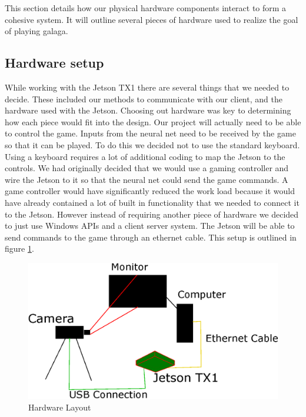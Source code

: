 \documentclass[onecolumn, draftclsnofoot,10pt, compsoc]{IEEEtran}
\begin{document}
This section details how our physical hardware components interact to form a cohesive system.
It will outline several pieces of hardware used to realize the goal of playing galaga.

\subsection{Hardware setup}%

While working with the Jetson TX1 there are several things that we needed to decide.
These included our methods to communicate with our client, and the hardware used with the Jetson.
Choosing out hardware was key to determining how each piece would fit into the design.
\newline
\newline
Our project will actually need to be able to control the game.
Inputs from the neural net need to be received by the game so that it can be played.
To do this we decided not to use the standard keyboard.
Using a keyboard requires a lot of additional coding to map the Jetson to the controls.
We had originally decided that we would use a gaming controller and wire the Jetson to it so that the neural net could send the game commands.
A game controller would have significantly reduced the work load because it would have already contained a lot of built in functionality that we needed to connect it to the Jetson.
However instead of requiring another piece of hardware we decided to just use Windows APIs and a client server system.
The Jetson will be able to send commands to the game through an ethernet cable.
This setup is outlined in figure \ref{fig:4.2}.
\newline
\newline
\begin{figure}
  \includegraphics[width=\textwidth]{design.eps}
  \caption{Hardware Layout}
  \label{fig:4.2}
\end{figure}%
\end{document}
